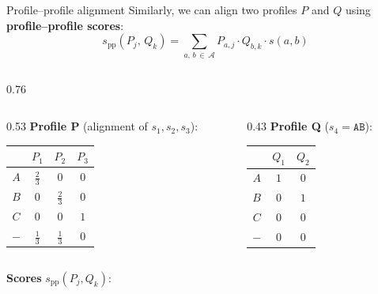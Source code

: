 \documentclass[aspectratio=169,t]{beamer}
\begin{document}
\begin{frame}{Profile--profile alignment}
  Similarly, we can align two profiles $P$ and $Q$ using \textbf{profile--profile scores}:
  \[
    s_\text{pp}(P_j,\,Q_k) = \sum_{a,\,b\,\in\,\mathcal{A}} P_{a,j}\cdot Q_{b,k}\cdot s(a,b)
  \]
  \begin{columns}[T]
    \begin{column}{0.76\textwidth}
      \begin{columns}[T]
        \begin{column}{0.53\linewidth}
          \textbf{Profile P} (alignment of $s_1,s_2,s_3$):\vspace{0.05cm}
          \begin{center}{\scriptsize
          \begin{tabular}{c|ccc}
            & $P_1$ & $P_2$ & $P_3$ \\\hline
            $A$ & $\tfrac{2}{3}$ & $0$            & $0$ \\
            $B$ & $0$            & $\tfrac{2}{3}$ & $0$ \\
            $C$ & $0$            & $0$            & $1$ \\
            $-$ & $\tfrac{1}{3}$ & $\tfrac{1}{3}$ & $0$ \\
          \end{tabular}}\end{center}
        \end{column}
        \begin{column}{0.43\linewidth}
          \textbf{Profile Q} ($s_4{=}\texttt{AB}$):\vspace{0.05cm}
          \begin{center}{\scriptsize
          \begin{tabular}{c|cc}
            & $Q_1$ & $Q_2$ \\\hline
            $A$ & $1$ & $0$ \\
            $B$ & $0$ & $1$ \\
            $C$ & $0$ & $0$ \\
            $-$ & $0$ & $0$ \\
          \end{tabular}}\end{center}
        \end{column}
      \end{columns}
      \begin{center}
        \textbf{Scores} $s_\text{pp}(P_j,Q_k)$:

\end{center}
\end{column}
\end{columns}
\end{frame}
\end{document}
